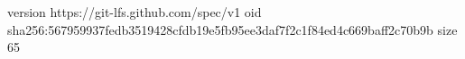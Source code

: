 version https://git-lfs.github.com/spec/v1
oid sha256:567959937fedb3519428cfdb19e5fb95ee3daf7f2c1f84ed4c669baff2c70b9b
size 65
